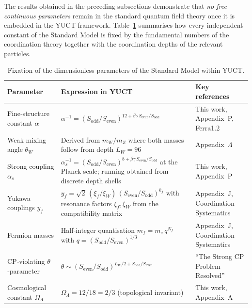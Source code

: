 \documentclass[12pt,a4paper]{article}
\begin{document}
	The results obtained in the preceding subsections demonstrate that \emph{no free continuous
		parameters} remain in the standard quantum field theory once it is embedded in the YUCT
	framework.  Table~\ref{tab:SMparams} summarises how every independent constant of the Standard
	Model is fixed by the fundamental numbers of the coordination theory together with the
	coordination depths of the relevant particles.
	
	\begin{table}[htbp]
		\centering
		\caption{Fixation of the dimensionless parameters of the Standard Model within YUCT.}
		\label{tab:SMparams}
		\small
		\begin{tabular}{@{}p{3.0cm} p{5.2cm} p{5.2cm}@{}}
			\toprule
			\textbf{Parameter} & \textbf{Expression in YUCT} & \textbf{Key references} \\
			\midrule
			Fine‑structure constant \(\alpha\) &
			\(\alpha^{-1} = (S_{\mathrm{odd}}/S_{\mathrm{even}})^{12+\beta\gamma\,S_{\mathrm{even}}/S_{\mathrm{odd}}}\) &
			This work, Appendix~P, Ferra1.2 \\
			Weak mixing angle \(\theta_W\) &
			Derived from \(m_W/m_Z\) where both masses follow from depth \(L_W=96\) &
			Appendix~\(\Lambda\) \\
			Strong coupling \(\alpha_s\) &
			\(\alpha_s^{-1} = (S_{\mathrm{odd}}/S_{\mathrm{even}})^{8+\beta\gamma\,S_{\mathrm{even}}/S_{\mathrm{odd}}}\) at the Planck scale; running obtained from discrete depth shells &
			This work, Appendix~P \\
			Yukawa couplings \(y_f\) &
			\(y_f = \sqrt{2}\,(\xi_f/\xi_W)\,(S_{\mathrm{even}}/S_{\mathrm{odd}})^{k_f}\) with resonance factors \(\xi_f,\xi_W\) from the compatibility matrix &
			Appendix~J, Coordination Systematics \\
			Fermion masses & Half‑integer quantisation \(m_f = m_e\,q^{N_f}\) with \(q=(S_{\mathrm{odd}}/S_{\mathrm{even}})^{1/3}\) &
			Appendix~J, Coordination Systematics \\
			CP‑violating \(\theta\)‑parameter &
			\(\theta \sim (S_{\mathrm{even}}/S_{\mathrm{odd}})^{L_W/2 + S_{\mathrm{odd}}/S_{\mathrm{even}}}\) &
			``The Strong CP Problem Resolved'' \\
			Cosmological constant \(\Omega_\Lambda\) &
			\(\Omega_\Lambda = 12/18 = 2/3\) (topological invariant) &
			This work, Appendix~A \\
			\bottomrule
		\end{tabular}
	\end{table}
	
\end{document}

